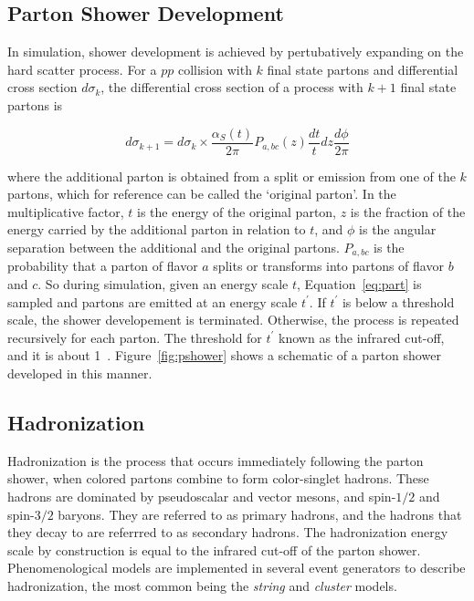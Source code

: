 \subsection{Parton Shower Development}
\label{sec:partonShower}
\par In simulation, shower development is achieved by pertubatively expanding on the hard scatter process. 
For a $pp$ collision with $k$ final state partons and differential cross section $d\sigma_{k}$,
the differential cross section of a process with $k+1$ final state partons is 
 
\begin{equation}
d\sigma_{k+1} = d\sigma_{k}\times\frac{\alpha_S(t)}{2\pi}P_{a,bc}(z)\frac{dt}{t}dz\frac{d\phi}{2\pi}
\label{eq:part}
\end{equation}

where the additional parton is obtained from a split or emission from one of the $k$ partons, which 
for reference can be called the `original parton'.
In the multiplicative factor, $t$ is the energy of the original parton, $z$ is the fraction of 
the energy carried by the additional parton in relation to $t$, and $\phi$ is the angular separation 
between the additional and the original partons. $P_{a,bc}$ is the probability that a parton of flavor 
$a$ splits or transforms into partons of flavor $b$ and $c$. So during simulation, given an energy scale $t$, Equation~\ref{eq:part} 
is sampled and partons are emitted at an energy scale $t^{'}$. If $t^{'}$ is below a threshold scale, the shower 
developement is terminated. Otherwise, the process is repeated recursively for each parton.
The threshold for $t^{'}$ known as the infrared cut-off, and it is about 1~\GeV. Figure~\ref{fig:pshower} 
shows a schematic of a parton shower developed in this manner.

\subsection{Hadronization}
\label{sec:hadronization}
\par Hadronization is the process that occurs immediately following the parton shower, when colored 
partons combine to form color-singlet hadrons. These hadrons are 
dominated by pseudoscalar and vector mesons, and spin-$1/2$ and spin-$3/2$ baryons.
They are referred to as primary hadrons, and the hadrons that they decay to 
are referrred to as secondary hadrons. The hadronization energy scale by construction 
is equal to the infrared cut-off of the parton shower. Phenomenological models are implemented 
in several event generators to describe hadronization, the most common being 
the {\it string} and {\it cluster} models. 

